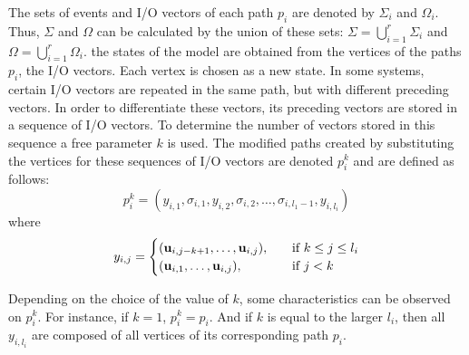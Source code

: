 The sets of events and I\slash O vectors of each path $p_i$ are denoted by $\Sigma_i$
and $\Omega_i$. Thus, $\Sigma$ and $\Omega$ can be calculated by the union of
these sets: $\Sigma=\bigcup_{i=1}^r\Sigma_i$ and
$\Omega=\bigcup_{i=1}^r\Omega_i$.
the states of the model are obtained from the vertices of the paths $p_i$, the I\slash O vectors.
Each vertex is chosen as a new state.
In some systems, certain I\slash O vectors are repeated in the same path, but with different preceding vectors.
In order to differentiate these vectors, its preceding vectors are stored in a sequence of I\slash O vectors.
To determine the number of vectors stored in this sequence a free parameter $k$ is used. 
The modified paths created by substituting the vertices for these sequences of I\slash O vectors are denoted $p_i^k$ and are defined as follows:
\begin{equation}
  \label{eq:modifiedPath}
 p_i^k= (y_{i,1},\sigma_{i,1},y_{i,2},\sigma_{i,2},\dots,\sigma_{i,l_1-1},y_{i,l_i}) 
\end{equation}
where 
\begin{equation}
  \label{eq:modifiedPathb}
y_{i,j}=\begin{cases}
    (\mathbf{u}_{i,j-k+1},\dots,\mathbf{u}_{i,j}),& \quad \text{if } k\leq j\leq l_i\\
    (\mathbf{u}_{i,1},\dots,\mathbf{u}_{i,j}),  & \quad \text{if } j<k
  \end{cases}
\end{equation}

\begin{observation}
Depending on the choice of the value of $k$, some characteristics can be
observed on $p_i^k$. For instance, if $k=1$, $p_i^k=p_i$. And if $k$ is equal to
the larger $l_i$, then all $y_{i,l_i}$ are composed of all vertices of its
corresponding path $p_i$.
\end{observation}

